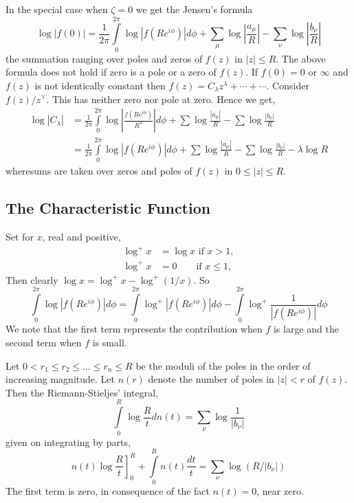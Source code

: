 \begin{coro*}
In the special case when $\zeta=0$ we get the Jensen's formula
\begin{equation*}
\log
|f(0)|=\frac{1}{2\pi}\int\limits^{2\pi}_{0}\log|f(Re^{i\phi})|d\phi+\sum_{\mu}\log\left|\frac{a_{\mu}}{R}\right|-\sum_{\nu}\log\left|\frac{b_{\nu}}{R}\right|\tag{1.2}\label{part1-eq1.2} 
\end{equation*}
the summation ranging over poles and zeros of $f(z)$ in $|z|\leq
R$. The above formula does not hold if zero is a pole or a zero of
$f(z)$. If $f(0)=0$ or $\infty$ and $f(z)$ is not identically constant
then $f(z)=C_{\lambda}z^{\lambda}+\cdots+\cdots$. Consider
$f(z)/z^{\curlyvee}$. This has neither zero nor pole at zero. Hence we
get,
\begin{align*}
\log |C_{\lambda}| &=
\frac{1}{2\pi}\int\limits^{2\pi}_{0} \log\left|
\frac{f(Re^{i\phi})}{R^{\lambda}}\right|d\phi+\sum 
\log \frac{|a_{\mu}|}{R}-\sum\log \frac{|b_{\nu}|}{R}\\
&=\frac{1}{2\pi}\int\limits^{2\pi}_{0}\log|f(Re^{i\phi})|
d\phi+\sum\log\frac{|a_{\mu}|}{R}-\sum 
\log \frac{|b_{\nu}|}{R}-\lambda\log R
\end{align*}
where\pageoriginale sums are taken over zeros and poles of $f(z)$ in
$0\leq |z|\leq R$.
\end{coro*}

\subsection{The Characteristic Function}\label{part1-sec1.3}

Set for $x$, real and positive,
\begin{align*}
\log^{+}x &= \log x\text{ \ if \ } x>1,\\
\log^{+}x &= 0\qquad\text{if \ } x \leq 1,
\end{align*}
Then clearly $\log x=\log^{+}x-\log^{+}(1/x)$. So
$$
\int\limits^{2\pi}_{0}\log|f(Re^{i\phi})|d\phi=\int\limits^{2\pi}_{0}\log^{+}|f(Re^{i\phi})|d\phi-\int\limits^{2\pi}_{0}\log^{+}\frac{1}{|f(Re^{i\phi})|}d\phi
$$
We note that the first term represents the contribution when $f$ is
large and the second term when $f$ is small.

Let $0<r_{1}\leq r_{2}\leq \ldots\leq r_{n}\leq R$ be the moduli of
the poles in the order of increasing magnitude. Let $n(r)$ denote the
number of poles in $|z|<r$ of $f(z)$. Then the Riemann-Stieljes'
integral,
$$
\int\limits^{R}_{0}\log \frac{R}{t}dn(t)=\sum_{\nu}\log\frac{1}{|b_{\nu}|}
$$
given on integrating by parts,
$$
\left. n(t)\log
\frac{R}{t}\right]^{R}_{0}+\int\limits^{R}_{0}n(t)\frac{dt}{t}=\sum_{\nu}\log(R/|b_{\nu}|) 
$$
The first term is zero, in consequence of the fact $n(t)=0$, near
zero.

